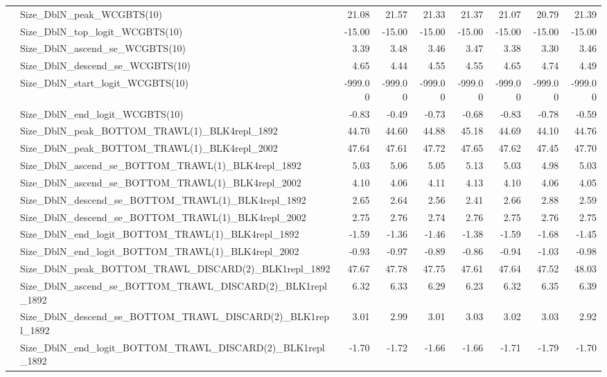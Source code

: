 \documentclass[
]{scrartcl}
\begin{document}
\begin{landscape}
\begin{longtable}{llrrrrrrr}
 & Size\_DblN\_peak\_WCGBTS(10) & 21.08 & 21.57 & 21.33 & 21.37 & 21.07 & 20.79 & 21.39 \\ 
 & Size\_DblN\_top\_logit\_WCGBTS(10) & -15.00 & -15.00 & -15.00 & -15.00 & -15.00 & -15.00 & -15.00 \\ 
 & Size\_DblN\_ascend\_se\_WCGBTS(10) & 3.39 & 3.48 & 3.46 & 3.47 & 3.38 & 3.30 & 3.46 \\ 
 & Size\_DblN\_descend\_se\_WCGBTS(10) & 4.65 & 4.44 & 4.55 & 4.55 & 4.65 & 4.74 & 4.49 \\ 
 & Size\_DblN\_start\_logit\_WCGBTS(10) & -999.00 & -999.00 & -999.00 & -999.00 & -999.00 & -999.00 & -999.00 \\ 
 & Size\_DblN\_end\_logit\_WCGBTS(10) & -0.83 & -0.49 & -0.73 & -0.68 & -0.83 & -0.78 & -0.59 \\ 
 & Size\_DblN\_peak\_BOTTOM\_TRAWL(1)\_BLK4repl\_1892 & 44.70 & 44.60 & 44.88 & 45.18 & 44.69 & 44.10 & 44.76 \\ 
 & Size\_DblN\_peak\_BOTTOM\_TRAWL(1)\_BLK4repl\_2002 & 47.64 & 47.61 & 47.72 & 47.65 & 47.62 & 47.45 & 47.70 \\ 
 & Size\_DblN\_ascend\_se\_BOTTOM\_TRAWL(1)\_BLK4repl\_1892 & 5.03 & 5.06 & 5.05 & 5.13 & 5.03 & 4.98 & 5.03 \\ 
 & Size\_DblN\_ascend\_se\_BOTTOM\_TRAWL(1)\_BLK4repl\_2002 & 4.10 & 4.06 & 4.11 & 4.13 & 4.10 & 4.06 & 4.05 \\ 
 & Size\_DblN\_descend\_se\_BOTTOM\_TRAWL(1)\_BLK4repl\_1892 & 2.65 & 2.64 & 2.56 & 2.41 & 2.66 & 2.88 & 2.59 \\ 
 & Size\_DblN\_descend\_se\_BOTTOM\_TRAWL(1)\_BLK4repl\_2002 & 2.75 & 2.76 & 2.74 & 2.76 & 2.75 & 2.76 & 2.75 \\ 
 & Size\_DblN\_end\_logit\_BOTTOM\_TRAWL(1)\_BLK4repl\_1892 & -1.59 & -1.36 & -1.46 & -1.38 & -1.59 & -1.68 & -1.45 \\ 
 & Size\_DblN\_end\_logit\_BOTTOM\_TRAWL(1)\_BLK4repl\_2002 & -0.93 & -0.97 & -0.89 & -0.86 & -0.94 & -1.03 & -0.98 \\ 
 & Size\_DblN\_peak\_BOTTOM\_TRAWL\_DISCARD(2)\_BLK1repl\_1892 & 47.67 & 47.78 & 47.75 & 47.61 & 47.64 & 47.52 & 48.03 \\ 
 & Size\_DblN\_ascend\_se\_BOTTOM\_TRAWL\_DISCARD(2)\_BLK1repl\_1892 & 6.32 & 6.33 & 6.29 & 6.23 & 6.32 & 6.35 & 6.39 \\ 
 & Size\_DblN\_descend\_se\_BOTTOM\_TRAWL\_DISCARD(2)\_BLK1repl\_1892 & 3.01 & 2.99 & 3.01 & 3.03 & 3.02 & 3.03 & 2.92 \\ 
 & Size\_DblN\_end\_logit\_BOTTOM\_TRAWL\_DISCARD(2)\_BLK1repl\_1892 & -1.70 & -1.72 & -1.66 & -1.66 & -1.71 & -1.79 & -1.70 \\ 

\end{longtable}
\end{landscape}
\end{document}
